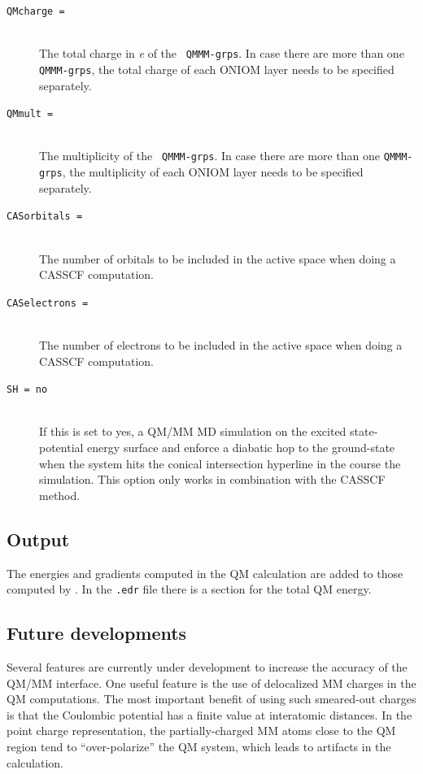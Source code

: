 \begin{description}
\item[\tt QMcharge = ]\mbox{}\\The total charge in {\it{e}} of the {\tt
QMMM-grps}. In case there are more than one {\tt QMMM-grps}, the total
charge of each ONIOM layer needs to be specified separately.

\item[\tt QMmult = ]\mbox{}\\The multiplicity of the {\tt
QMMM-grps}. In case there are more than one {\tt QMMM-grps}, the
multiplicity of each ONIOM layer needs to be specified separately.

\item[\tt CASorbitals = ]\mbox{}\\The number of orbitals to be
included in the active space when doing a CASSCF computation.

\item[\tt CASelectrons = ]\mbox{}\\The number of electrons to be
included in the active space when doing a CASSCF computation.

\item[\tt SH = no]\mbox{}\\If this is set to yes, a QM/MM MD
simulation on the excited state-potential energy surface and enforce a
diabatic hop to the ground-state when the system hits the conical
intersection hyperline in the course the simulation. This option only
works in combination with the CASSCF method.

\end{description}

\subsection{Output}

The energies and gradients computed in the QM calculation are added to
those computed by {\gromacs}. In the {\tt .edr} file there is a section
for the total QM energy.

\subsection{Future developments}

Several features are currently under development to increase the
accuracy of the QM/MM interface. One useful feature is the use of
delocalized MM charges in the QM computations. The most important
benefit of using such smeared-out charges is that the Coulombic
potential has a finite value at interatomic distances. In the point
charge representation, the partially-charged MM atoms close to the QM
region tend to ``over-polarize'' the QM system, which leads to artifacts
in the calculation.

